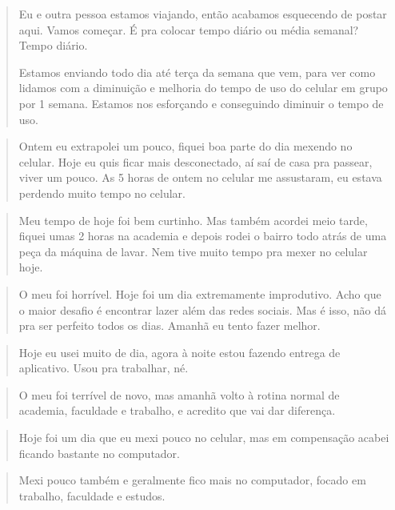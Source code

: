 \begin{quote}
Eu e outra pessoa estamos viajando, então acabamos esquecendo de postar aqui. Vamos começar. É pra colocar tempo diário ou média semanal? Tempo diário.

Estamos enviando todo dia até terça da semana que vem, para ver como lidamos com a diminuição e melhoria do tempo de uso do celular em grupo por 1 semana. Estamos nos esforçando e conseguindo diminuir o tempo de uso.
\end{quote}

\begin{quote}
Ontem eu extrapolei um pouco, fiquei boa parte do dia mexendo no celular. Hoje eu quis ficar mais desconectado, aí saí de casa pra passear, viver um pouco. As 5 horas de ontem no celular me assustaram, eu estava perdendo muito tempo no celular.
\end{quote}

\begin{quote}
Meu tempo de hoje foi bem curtinho. Mas também acordei meio tarde, fiquei umas 2 horas na academia e depois rodei o bairro todo atrás de uma peça da máquina de lavar. Nem tive muito tempo pra mexer no celular hoje.
\end{quote}

\begin{quote}
O meu foi horrível. Hoje foi um dia extremamente improdutivo. Acho que o maior desafio é encontrar lazer além das redes sociais. Mas é isso, não dá pra ser perfeito todos os dias. Amanhã eu tento fazer melhor.
\end{quote}

\begin{quote}
Hoje eu usei muito de dia, agora à noite estou fazendo entrega de aplicativo. Usou pra trabalhar, né.
\end{quote}

\begin{quote}
O meu foi terrível de novo, mas amanhã volto à rotina normal de academia, faculdade e trabalho, e acredito que vai dar diferença.
\end{quote}

\begin{quote}
Hoje foi um dia que eu mexi pouco no celular, mas em compensação acabei ficando bastante no computador.
\end{quote}

\begin{quote}
Mexi pouco também e geralmente fico mais no computador, focado em trabalho, faculdade e estudos.
\end{quote}

